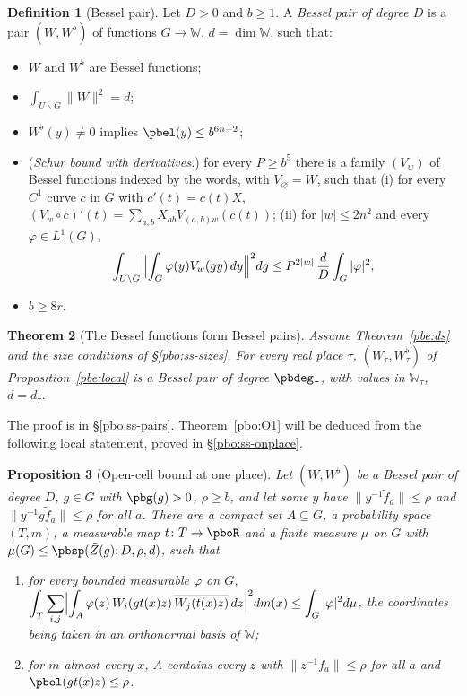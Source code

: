 \documentclass[10pt]{amsart}
\newtheorem{theorem}{Theorem}[section]
\newtheorem{proposition}[theorem]{Proposition}
\theoremstyle{definition}
\newtheorem{definition}[theorem]{Definition}
\theoremstyle{remark}
\providecommand{\aubar}[1]{\overline{#1}}
\begin{document}
\begin{definition}[Bessel pair]\label{pbo:def-system}
Let $D>0$ and $b\ge1$. A \emph{Bessel pair of degree $D$} is a pair $(W,W^\flat)$ of functions $G\to
\mathbb W$, $d=\dim\mathbb W$, such that:
\begin{itemize}
\item[(BS1)] $W$ and $W^\flat$ are Bessel functions;
\item[(BS2)] $\int_{U\backslash G}\|W\|^2=d$;
\item[(BS3)] $W^\flat(y)\ne0$ implies $\pbel(y)\le b^{6n+2}$;
\item[(BS4)] (\emph{Schur bound with derivatives.}) for every $P\ge b^5$ there is a family
$(V_w)$ of Bessel functions indexed by the words, with $V_\varnothing=W$, such that (i) for every
$C^1$ curve $c$ in $G$ with $c'(t)=c(t)X$, $(V_w\circ c)'(t)=\sum_{a,b}X_{ab}V_{(a,b)w}(c(t))$; (ii)
for $|w|\le2n^2$ and every $\varphi\in L^1(G)$,
\[
\int_{U\backslash G}\Bigl\|\int_G\varphi(y)V_w(gy)\,dy\Bigr\|^2dg\le P^{2|w|}\,\frac dD\int_G|\varphi|^2 ;
\]
\item[(BS5)] $b\ge8r$.
\end{itemize}
\end{definition}


\begin{theorem}[The Bessel functions form Bessel pairs]\label{pbo:system}
Assume Theorem~\ref{pbe:ds} and the size conditions of \S\ref{pbo:ss-sizes}. For
every real place $\tau$, $(W_\tau,W^\flat_\tau)$ of Proposition~\ref{pbe:local} is a Bessel pair of
degree $\pbdeg_\tau$, with values in $\mathbb W_\tau$, $d=d_\tau$.
\end{theorem}

The proof is in \S\ref{pbo:ss-pairs}. Theorem~\ref{pbo:O1} will be deduced from the following local
statement, proved in \S\ref{pbo:ss-onplace}.

\begin{proposition}[Open-cell bound at one place]\label{pbo:local}
Let $(W,W^\flat)$ be a Bessel pair of degree $D$, $g\in G$ with $\pbg(g)>0$, $\rho\ge b$, and let some
$y$ have $\|y^{-1}\tilde f_a\|\le\rho$ and $\|y^{-1}g\tilde f_a\|\le\rho$ for all $a$. There are a compact
set $A\subseteq G$, a probability space $(T,m)$, a measurable map $t\colon T\to\pboR$ and a finite
measure $\mu$ on $G$ with $\mu(G)\le\pbsp(\tilde Z(g);D,\rho,d)$, such that
\begin{enumerate}
\item[(a)] for every bounded measurable $\varphi$ on $G$,
$\displaystyle\int_T\sum_{i,j}\Bigl|\int_A\varphi(z)\,W_i(gt(x)z)\,\aubar{W_j(t(x)z)}\,dz\Bigr|^2dm(x)\le
\int_G|\varphi|^2d\mu$, the coordinates being taken in an orthonormal basis of $\mathbb W$;
\item[(b)] for $m$-almost every $x$, $A$ contains every $z$ with $\|z^{-1}\tilde f_a\|\le\rho$ for all $a$
and $\pbel(gt(x)z)\le\rho$.
\end{enumerate}
\end{proposition}
\end{document}
